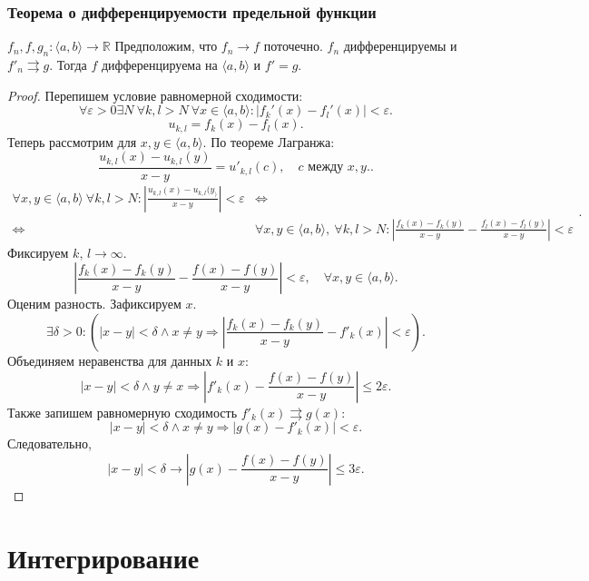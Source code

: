 \documentclass[11pt]{book}
\newcommand{\R}{\mathbb{R}}
\renewcommand{\le}{\leqslant}
\theoremstyle{definition}
\theoremstyle{plain}
\theoremstyle{plain}
\theoremstyle{definition}
\theoremstyle{remark}
\begin{document}
\subsection{Теорема о дифференцируемости предельной функции}
\begin{thm}
    $f_n, f, g_n : \langle a, b \rangle  \to  \R$ Предположим, что $f_n \to  f$ поточечно.
    $f_n$ дифференцируемы и $f'_n \rightrightarrows g$. Тогда $f$  дифференцируема на $\langle a, b \rangle$ и $f '= g$.
\end{thm}
\begin{proof}
    Перепишем условие равномерной сходимости:
    \[
	\forall  \varepsilon >0 \exists  N ~ \forall  k, l > N~ \forall  x \in  \langle a, b\rangle : |f_k'(x)  - f_l'(x) | < \varepsilon
    .\]
    \[
	u_{k, l} = f_k(x) - f_l(x)
    .\]
    Теперь рассмотрим для $x, y \in  \langle a, b \rangle$. По теореме Лагранжа:
    \[
	\frac{u_{k, l} (x)  - u_{k, l} (y)}{x-y} = u'_{k,l}(c), \quad c \text{ между } x, y.
    .\]
    \[
	\begin{aligned}
	    \forall x, y \in  \langle a, b \rangle ~ \forall k , l >N: \left| \frac{u_{k, l} (x) - u_{k, l} (y_)}{x - y} \right | < \varepsilon & \Longleftrightarrow \\ 
															       \Longleftrightarrow & \forall  x, y \in  \langle a, b \rangle , ~\forall  k, l > N:
	    \left | \frac{f_k(x) - f_k(y) }{x-y} - \frac{f_l(x) - f_l(y)}{x-y} \right | < \varepsilon
															   \end{aligned}
    .\]
    Фиксируем $k$, $l \to  \infty$.
    \[
	\left | \frac{f_k(x) - f_k(y)}{x - y} - \frac{f(x) - f(y)}{x-y} \right | < \varepsilon  , \quad \forall  x, y \in  \langle a, b \rangle
    .\]
    Оценим разность. Зафиксируем $ x$.
    \[
		\exists  \delta  >0 : \left(|x-y| < \delta  \wedge x \ne y \Longrightarrow   \left|\frac{f_k(x) - f_k(y)}{x-y} - f'_k(x)\right|  < \varepsilon\right)
    .\]
    Объединяем неравенства для данных $ k$ и $ x$:
    \[
	|x - y| < \delta  \wedge  y \ne x \Longrightarrow   \left|f'_k(x) - \frac{f(x) - f(y)}{x-y}\right| \le  2 \varepsilon
    .\]
    Также запишем равномерную сходимость $ f'_k(x) \rightrightarrows g(x)$:
     \[
	 |x-y|< \delta \wedge x \ne y \Longrightarrow |g(x) - f'_k(x)| < \varepsilon 
    .\] 
    Следовательно,
    \[
	|x - y| < \delta \to  \left|g(x) - \frac{f(x) - f(y)}{x-y}\right| \le 3 \varepsilon
    .\]
\end{proof}
\chapter{Интегрирование}
\end{document}
